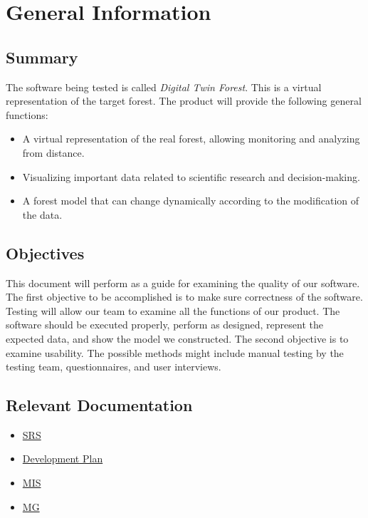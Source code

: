 \documentclass[12pt, titlepage]{article}
\begin{document}



\section{General Information}
\subsection{Summary}
The software being tested is called \textit{Digital Twin Forest}. 
This is a virtual representation of the target forest. The product 
will provide the following general functions:
\begin{itemize}
\item A virtual representation of the real forest,
allowing monitoring and analyzing from distance.
\item Visualizing important data related to scientific 
research and decision-making.
\item A forest model that can change dynamically 
according to the modification of the data.
\end{itemize}

\subsection{Objectives}

This document will perform as a guide for examining the quality of
our software. The first objective to be accomplished is to make sure
correctness of the software. Testing will allow our team to examine 
all the functions of our product. The software should be executed 
properly, perform as designed, represent the expected data, and
show the model we constructed. The second objective is to examine 
usability. The possible methods might include manual testing by the 
testing team, questionnaires, and user interviews. 

\subsection{Relevant Documentation}
\begin{itemize}
\item \href{https://github.com/wuj187/DigitalTwinCAS/blob/main/docs/SRS/SRS.pdf}{SRS}

\item \href{https://github.com/wuj187/DigitalTwinCAS/blob/main/docs/DevelopmentPlan/DevelopmentPlan.pdf}{Development Plan}

\item \href{https://github.com/wuj187/DigitalTwinCAS/blob/main/docs/Design/Software-Detailed-Design/MIS.pdf}{MIS}

\item \href{https://github.com/wuj187/DigitalTwinCAS/blob/main/docs/Design/Software-Architecture-Design/MG.pdf}{MG}
\end{itemize}
\end{document}
